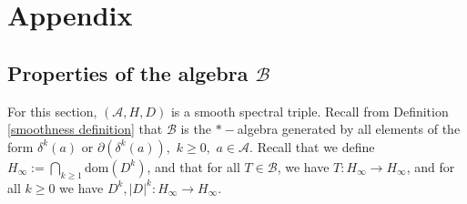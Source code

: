 \chapter{Appendix}

\section{Properties of the algebra $\mathcal{B}$}\label{b prop app}
    For this section, $(\mathcal{A},H,D)$ is a smooth spectral triple.
    Recall from Definition \ref{smoothness definition} that $\mathcal{B}$ is the $*-$algebra generated by all elements of the form $\delta^k(a)$ or $\partial(\delta^k(a)),$ $k\geq0,$ $a\in\mathcal{A}.$
    Recall that we define $H_\infty := \bigcap_{k\geq 1} \mathrm{dom}(D^k)$, and that for all $T \in \mathcal{B}$, we have $T:H_\infty\to H_\infty$, and for all $k\geq 0$ we have $D^k,|D|^k:H_\infty\to H_\infty$.
    
